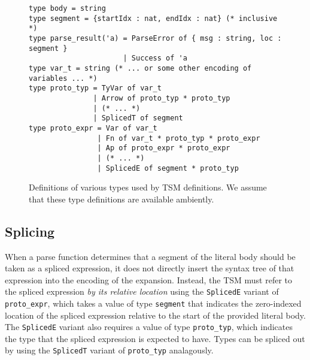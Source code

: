 \documentclass[acmlarge,review,anonymous]{acmart}\settopmatter{printfolios=true}
\newcommand{\li}[1]{\lstinline{#1}}
\begin{document}
\begin{figure}
\begin{lstlisting}[numbers=none]
type body = string
type segment = {startIdx : nat, endIdx : nat} (* inclusive *)
type parse_result('a) = ParseError of { msg : string, loc : segment }
                      | Success of 'a
type var_t = string (* ... or some other encoding of variables ... *)
type proto_typ = TyVar of var_t 
               | Arrow of proto_typ * proto_typ 
               | (* ... *) 
               | SplicedT of segment
type proto_expr = Var of var_t 
                | Fn of var_t * proto_typ * proto_expr
                | Ap of proto_expr * proto_expr
                | (* ... *) 
                | SplicedE of segment * proto_typ

\end{lstlisting}
\vspace{-5px}
\caption[Definitions of various types used by TSM definitions.]{Definitions of various types used by TSM definitions. We assume that these type definitions are available ambiently.}
\label{fig:indexrange-and-parseresult}
\label{fig:candidate-exp-verseml}
\vspace{-5px}
\end{figure}

\subsection{Splicing}\label{sec:splicing-and-hygiene}
When a parse function determines that a segment of the literal body should be taken as a spliced expression, it does not directly insert the syntax tree of that expression into the encoding of the expansion. Instead, 
the TSM must refer to the spliced expression \emph{by its relative location} using the \li{SplicedE} variant of \li{proto_expr}, which takes a value of type \li{segment} that indicates the zero-indexed location of the spliced expression relative to the start of the provided literal body. The \li{SplicedE} variant also requires a value of type \li{proto_typ}, which indicates the type that the spliced expression is expected to have. Types can be spliced out by using the \li{SplicedT} variant of \li{proto_typ} analagously.
\end{document}
